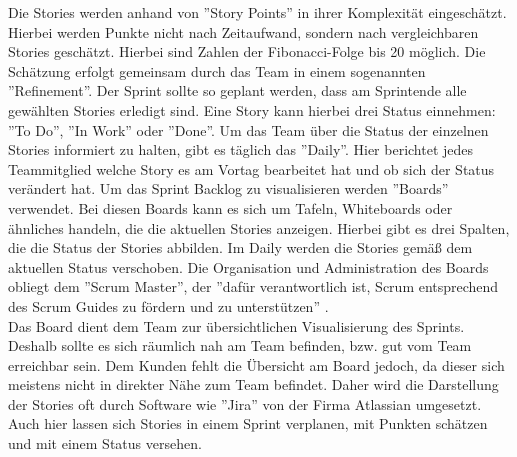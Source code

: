 \documentclass[12pt,titlepage]{scrartcl}
\begin{document}
		Die Stories werden anhand von ''Story Points'' in ihrer Komplexität eingeschätzt. Hierbei werden Punkte nicht nach Zeitaufwand, sondern nach vergleichbaren Stories geschätzt. Hierbei sind Zahlen der Fibonacci-Folge bis 20 möglich. Die Schätzung erfolgt gemeinsam durch das Team in einem sogenannten ''Refinement''. Der Sprint sollte so geplant werden, dass am Sprintende alle gewählten Stories erledigt sind. Eine Story kann hierbei drei Status einnehmen: ''To Do'', ''In Work'' oder ''Done''. Um das Team über die Status der einzelnen Stories informiert zu halten, gibt es täglich das ''Daily''. Hier berichtet jedes Teammitglied welche Story es am Vortag bearbeitet hat und ob sich der Status verändert hat. Um das Sprint Backlog zu visualisieren werden ''Boards'' verwendet. Bei diesen Boards kann es sich um Tafeln, Whiteboards oder ähnliches handeln, die die aktuellen Stories anzeigen. Hierbei gibt es drei Spalten, die die Status der Stories abbilden. Im Daily werden die Stories gemäß dem aktuellen Status verschoben. Die Organisation und Administration des Boards obliegt dem ''Scrum Master'', der ''dafür verantwortlich ist, Scrum entsprechend des Scrum Guides zu fördern	und zu unterstützen'' \cite{guide}. \\
		Das Board dient dem Team zur übersichtlichen Visualisierung des Sprints. Deshalb sollte es sich räumlich nah am Team befinden, bzw. gut vom Team erreichbar sein. Dem Kunden fehlt die Übersicht am Board jedoch, da dieser sich meistens nicht in direkter Nähe zum Team befindet. Daher wird die Darstellung der Stories oft durch Software wie ''Jira'' von der Firma Atlassian umgesetzt. Auch hier lassen sich Stories in einem Sprint verplanen, mit Punkten schätzen und mit einem Status versehen.
		
\end{document}

